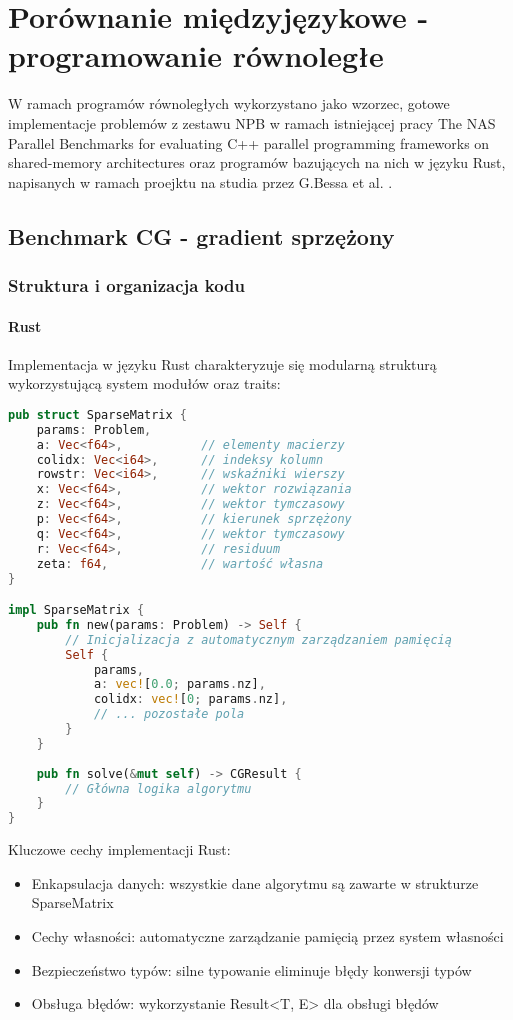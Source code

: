 \chapter{Porównanie międzyjęzykowe - programowanie równoległe}
W ramach programów równoległych wykorzystano jako wzorzec, gotowe implementacje problemów z zestawu NPB w ramach istniejącej pracy The NAS Parallel Benchmarks for evaluating C++ parallel programming frameworks on shared-memory architectures \cite{CPPNPB} oraz programów bazujących na nich w języku Rust, napisanych w ramach proejktu na studia przez G.Bessa et al. \cite{NPBRust}.

\section{Benchmark CG - gradient sprzężony}
\subsection{Struktura i organizacja kodu}
\subsubsection{Rust}
Implementacja w języku Rust charakteryzuje się modularną strukturą wykorzystującą system modułów oraz traits:
\begin{lstlisting}[language=Rust, caption={Modularna struktura benchmarku CG w języku Rust}, label={lst:cg_rust_structure}]
pub struct SparseMatrix {
    params: Problem,
    a: Vec<f64>,           // elementy macierzy
    colidx: Vec<i64>,      // indeksy kolumn
    rowstr: Vec<i64>,      // wskaźniki wierszy
    x: Vec<f64>,           // wektor rozwiązania
    z: Vec<f64>,           // wektor tymczasowy
    p: Vec<f64>,           // kierunek sprzężony
    q: Vec<f64>,           // wektor tymczasowy
    r: Vec<f64>,           // residuum
    zeta: f64,             // wartość własna
}

impl SparseMatrix {
    pub fn new(params: Problem) -> Self {
        // Inicjalizacja z automatycznym zarządzaniem pamięcią
        Self {
            params,
            a: vec![0.0; params.nz],
            colidx: vec![0; params.nz],
            // ... pozostałe pola
        }
    }
    
    pub fn solve(&mut self) -> CGResult {
        // Główna logika algorytmu
    }
}
\end{lstlisting}
Kluczowe cechy implementacji Rust:
\begin{itemize}
    \item Enkapsulacja danych: wszystkie dane algorytmu są zawarte w strukturze SparseMatrix
    \item Cechy własności: automatyczne zarządzanie pamięcią przez system własności
    \item Bezpieczeństwo typów: silne typowanie eliminuje błędy konwersji typów
    \item Obsługa błędów: wykorzystanie Result<T, E> dla obsługi błędów
\end{itemize}

